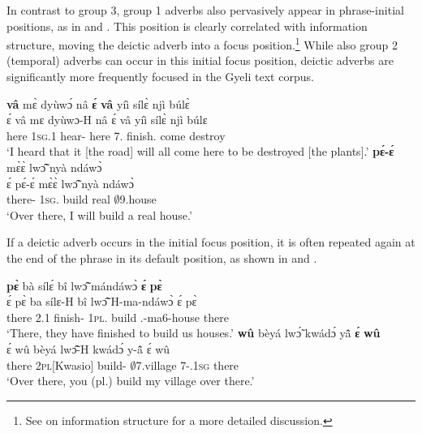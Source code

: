 In contrast to group 3, group 1 adverbs also pervasively appear in phrase-initial positions, as in  and . This position is clearly correlated with information structure, moving the deictic adverb into a focus position.\footnote{See  on information structure for a more detailed discussion.} While also group 2 (temporal) adverbs can occur in this initial focus position, deictic adverbs are significantly more frequently focused in the Gyeli text corpus.

\ea \label{ADV1initiala}
   {\bfseries vâ} mɛ̀ dyùwɔ́ nâ {\bfseries ɛ́} {\bfseries vâ} yíì sílɛ̀ njì búlɛ̀\\
         ɛ́ vâ mɛ dyùwɔ-H nâ ɛ́ vâ yíì sílɛ̀ njì búlɛ\\
         {\LOC} here 1\textsc{sg}.{\PST}1 hear-{\R} {\COMP} {\LOC} here 7.{\FUT} finish.{\FUT} come destroy\\
    \trans `I heard that it [the road] will all come here to be destroyed [the plants].'
\ex \label{ADV1initialb}
   {\bfseries pɛ́-ɛ́} mɛ̀ɛ̀ lwɔ̃̂ nyà ndáwɔ̀ \\
        ɛ́ pɛ́-ɛ́ mɛ̀ɛ̀ lwɔ̃̂ nyà ndáwɔ̀ \\
          {\LOC} there-{\DIST} 1\textsc{sg}.{\FUT} build real $\emptyset$9.house\\
    \trans `Over there, I will build a real house.'
\z



\noindent If a deictic adverb occurs in the initial focus position, it is often repeated again at the end of the phrase in its default position, as shown in  and .


\ea \label{ADV1botha}
   {\bfseries pɛ̀} bà sílɛ́ bî lwɔ̃̂ mándáwɔ̀ {\bfseries ɛ́} {\bfseries pɛ̀}\\
        ɛ́ pɛ̀ ba sílɛ-H bî lwɔ̃̂ H-ma-ndáwɔ̀ ɛ́ pɛ̀\\
        {\LOC} there 2.{\PST}1 finish-{\R} 1\textsc{pl}.{\OBJ} build {\OBJ}.{\LINK}-ma6-house {\LOC} there\\
    \trans `There, they have finished to build us houses.'
\ex \label{ADV1bothb}
   {\bfseries wû} bèyá lwɔ̃́ kwádɔ́ yã̂ {\bfseries ɛ́} {\bfseries wû}\\
         ɛ́ wû bèyá lwɔ̃̂-H kwádɔ́ y-ã̂ ɛ́ wû\\
         {\LOC} there 2\textsc{pl}[Kwasio] build-{\R} $\emptyset$7.village 7-{\POSS}.1\textsc{sg} {\LOC} there\\
    \trans `Over there, you (pl.) build my village over there.'
\z



